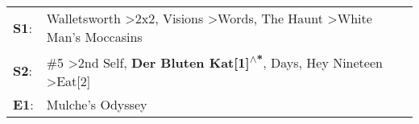 \begin{supertabular}{p{0.03\textwidth}p{0.92\textwidth}}
 \textbf{S1}:  &    Walletsworth\textsuperscript{} \textgreater \enspace 2x2\textsuperscript{}, \enspace Visions\textsuperscript{} \textgreater \enspace Words\textsuperscript{}, \enspace The Haunt\textsuperscript{} \textgreater \enspace White Man's Moccasins\textsuperscript{}  \enspace  \\
 \textbf{S2}:  &  \#5\textsuperscript{} \textgreater \enspace 2nd Self\textsuperscript{}, \enspace \textbf{Der Bluten Kat[1]\textsuperscript{$\wedge$*}},  Days\textsuperscript{}, \enspace Hey Nineteen\textsuperscript{} \textgreater \enspace Eat[2]\textsuperscript{}  \enspace  \\
 \textbf{E1}:  &                                                                                                                                                                                                                                  Mulche's Odyssey\textsuperscript{}  \enspace  \\
\end{supertabular}
